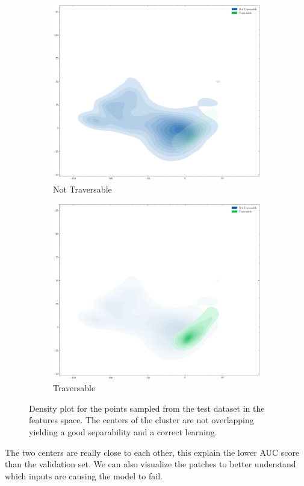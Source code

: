 \documentclass[../document.tex]{subfiles}
\begin{document}
\begin{figure}[H]
\begin{subfigure}[b]{0.48\textwidth}
    \includegraphics[width=\linewidth]{../img/5/pca/pca-test-0-density.png}
    \caption{Not Traversable}
\end{subfigure}
\begin{subfigure}[b]{0.48\textwidth}
    \includegraphics[width=\linewidth]{../img/5/pca/pca-test-1-density.png}
    \caption{Traversable}
\end{subfigure}
\caption{Density plot for the points sampled from the test dataset in the features space. The centers of the cluster are not overlapping yielding a good separability and a correct learning.}
\end{figure}
The two centers are really close to each other, this explain the lower AUC score than the validation set. We can also visualize the patches to better understand which inputs are causing the model to fail.
\end{document}
